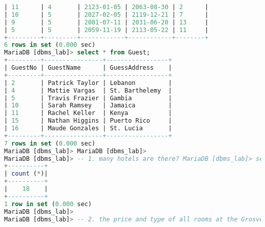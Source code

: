 \documentclass{article}
\begin{document}
\begin{lstlisting}[language=SQL]
| 11      | 4       | 2123-01-05 | 2063-08-30 | 2      |
| 10      | 5       | 2027-02-05 | 2119-12-21 | 7      | 
| 9       | 5       | 2081-07-11 | 2031-06-20 | 13     |
| 5       | 5       | 2059-11-19 | 2113-05-22 | 11     | 
+---------+---------+------------+------------+--------+
6 rows in set (0.000 sec)
MariaDB [dbms_lab]> select * from Guest; 
+---------+----------------+-----------------+
| GuestNo | GuestName      | GuessAddress    | 
+---------+----------------+-----------------+
| 2       | Patrick Taylor | Lebanon         |
| 4       | Mattie Vargas  | St. Barthelemy  |
| 5       | Travis Frazier | Gambia          | 
| 10      | Sarah Ramsey   | Jamaica         |
| 11      | Rachel Keller  | Kenya           |
| 15      | Nathan Higgins | Puerto Rico     |
| 16      | Maude Gonzales | St. Lucia       | 
+---------+----------------+-----------------+
7 rows in set (0.000 sec)
MariaDB [dbms_lab]> MariaDB [dbms_lab]>
MariaDB [dbms_lab]> -- 1. many hotels are there? MariaDB [dbms_lab]> select count(*) from Hotel;
+----------+ 
| count (*)|
+----------+ 
|    18    |
+----------+
1 row in set (0.000 sec)
MariaDB [dbms_lab]>
MariaDB [dbms_lab]> -- 2. the price and type of all rooms at the Grosvenor Hotel.


\end{lstlisting}
\end{document}
